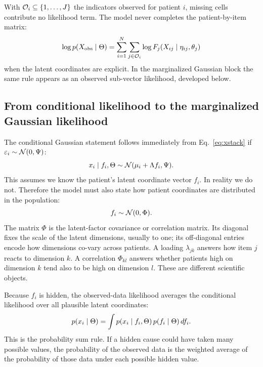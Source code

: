 \begin{definitionbox}
With $\mathcal{O}_i\subseteq\{1,\dots,J\}$ the indicators observed for patient $i$, missing cells contribute no
likelihood term. The model never completes the patient-by-item matrix:
\[
\log p(X_{\mathrm{obs}}\mid\Theta)
=\sum_{i=1}^{N}\sum_{j\in\mathcal{O}_i}\log F_j\!\left(X_{ij}\mid\eta_{ij},\theta_j\right)
\]
when the latent coordinates are explicit. In the marginalized Gaussian block the same rule appears as an
observed sub-vector likelihood, developed below.
\end{definitionbox}

\subsection{From conditional likelihood to the marginalized Gaussian likelihood}
\label{sub:marginal}
The conditional Gaussian statement follows immediately from Eq.~\eqref{eq:xstack} if
$\varepsilon_i\sim\mathcal{N}(0,\Psi)$:
\begin{equation}
\label{eq:conditional_gaussian}
x_i\mid f_i,\Theta \sim \mathcal{N}(\mu_i+\Lambda f_i,\Psi).
\end{equation}
This assumes we know the patient's latent coordinate vector $f_i$. In reality we do not. Therefore the model
must also state how patient coordinates are distributed in the population:
\begin{equation}
\label{eq:latent_distribution}
f_i\sim\mathcal{N}(0,\Phi).
\end{equation}
The matrix $\Phi$ is the latent-factor covariance or correlation matrix. Its diagonal fixes the scale of the
latent dimensions, usually to one; its off-diagonal entries encode how dimensions co-vary across patients. A
loading $\lambda_{jk}$ answers how item $j$ reacts to dimension $k$. A correlation $\Phi_{kl}$ answers whether
patients high on dimension $k$ tend also to be high on dimension $l$. These are different scientific objects.

Because $f_i$ is hidden, the observed-data likelihood averages the conditional likelihood over all plausible
latent coordinates:
\begin{equation}
\label{eq:fulllik}
p(x_i\mid\Theta)
=\int p(x_i\mid f_i,\Theta)\,p(f_i\mid\Theta)\,df_i .
\end{equation}
This is the probability sum rule. If a hidden cause could have taken many possible values, the probability of the
observed data is the weighted average of the probability of those data under each possible hidden value.

